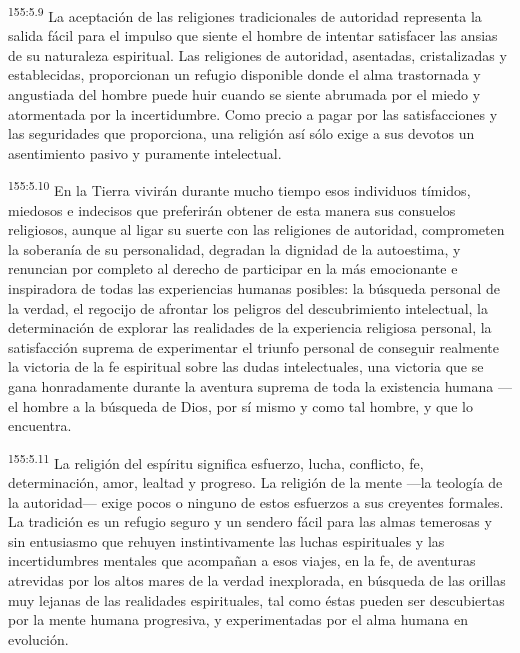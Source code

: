 \par
\textsuperscript{155:5.9} La aceptación de las religiones tradicionales de autoridad representa la salida fácil para el impulso que siente el hombre de intentar satisfacer las ansias de su naturaleza espiritual. Las religiones de autoridad, asentadas, cristalizadas y establecidas, proporcionan un refugio disponible donde el alma trastornada y angustiada del hombre puede huir cuando se siente abrumada por el miedo y atormentada por la incertidumbre. Como precio a pagar por las satisfacciones y las seguridades que proporciona, una religión así sólo exige a sus devotos un asentimiento pasivo y puramente intelectual.

\par
\textsuperscript{155:5.10} En la Tierra vivirán durante mucho tiempo esos individuos tímidos, miedosos e indecisos que preferirán obtener de esta manera sus consuelos religiosos, aunque al ligar su suerte con las religiones de autoridad, comprometen la soberanía de su personalidad, degradan la dignidad de la autoestima, y renuncian por completo al derecho de participar en la más emocionante e inspiradora de todas las experiencias humanas posibles: la búsqueda personal de la verdad, el regocijo de afrontar los peligros del descubrimiento intelectual, la determinación de explorar las realidades de la experiencia religiosa personal, la satisfacción suprema de experimentar el triunfo personal de conseguir realmente la victoria de la fe espiritual sobre las dudas intelectuales, una victoria que se gana honradamente durante la aventura suprema de toda la existencia humana ---el hombre a la búsqueda de Dios, por sí mismo y como tal hombre, y que lo encuentra.

\par
\textsuperscript{155:5.11} La religión del espíritu significa esfuerzo, lucha, conflicto, fe, determinación, amor, lealtad y progreso. La religión de la mente ---la teología de la autoridad--- exige pocos o ninguno de estos esfuerzos a sus creyentes formales. La tradición es un refugio seguro y un sendero fácil para las almas temerosas y sin entusiasmo que rehuyen instintivamente las luchas espirituales y las incertidumbres mentales que acompañan a esos viajes, en la fe, de aventuras atrevidas por los altos mares de la verdad inexplorada, en búsqueda de las orillas muy lejanas de las realidades espirituales, tal como éstas pueden ser descubiertas por la mente humana progresiva, y experimentadas por el alma humana en evolución.

